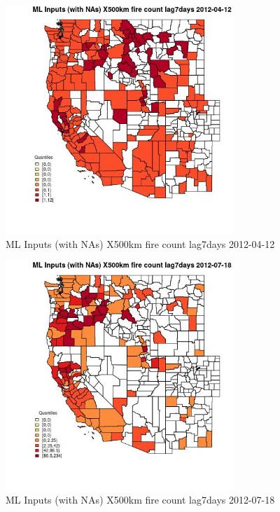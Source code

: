 \begin{figure} 
\centering  
\includegraphics[width=0.77\textwidth]{Code_Outputs/Report_ML_input_PM25_Step4_part_e_de_duplicated_aves_compiled_2019-05-14wNAs_CountyX500km_fire_count_lag7daysMean2012-04-12_2012-04-12.jpg} 
\caption{\label{fig:Report_ML_input_PM25_Step4_part_e_de_duplicated_aves_compiled_2019-05-14wNAsCountyX500km_fire_count_lag7daysMean2012-04-12_2012-04-12}ML Inputs (with NAs) X500km fire count lag7days 2012-04-12} 
\end{figure} 
 

\begin{figure} 
\centering  
\includegraphics[width=0.77\textwidth]{Code_Outputs/Report_ML_input_PM25_Step4_part_e_de_duplicated_aves_compiled_2019-05-14wNAs_CountyX500km_fire_count_lag7daysMean2012-07-18_2012-07-18.jpg} 
\caption{\label{fig:Report_ML_input_PM25_Step4_part_e_de_duplicated_aves_compiled_2019-05-14wNAsCountyX500km_fire_count_lag7daysMean2012-07-18_2012-07-18}ML Inputs (with NAs) X500km fire count lag7days 2012-07-18} 
\end{figure} 
 

